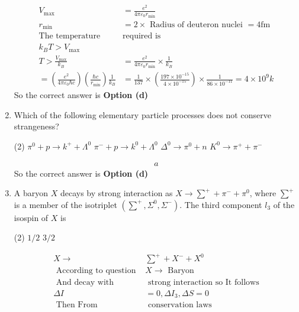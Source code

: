 \begin{enumerate}
\begin{answer}
$$\begin{aligned}
	V_{\max }&=\frac{e^2}{4 \pi \varepsilon_0 r_{\min }}\\
	r_{\min }&=2 \times\text{ Radius of deuteron nuclei }=4 \mathrm{fm}\\
	\text{The temperature }&\text{required is}\\
	k_B T>V_{\max }& \\
	T>\frac{V_{\max }}{k_B}&=\frac{e^2}{4 \pi \varepsilon_0 r_{\min }} \times \frac{1}{k_B} \\
	=\left(\frac{e^2}{4 \pi \varepsilon_0 \hbar c}\right)\left(\frac{\hbar c}{r_{\min }}\right) \frac{1}{k_B}&=\frac{1}{137} \times\left(\frac{197 \times 10^{-15}}{4 \times 10^{-15}}\right) \times \frac{1}{86 \times 10^{-11}}=4 \times 10^9 k
\end{aligned}
$$
So the correct answer is \textbf{Option (d)}
\end{answer}
	\item Which of the following elementary particle processes does not conserve strangeness?
 \begin{tasks}(2)
	\task[\textbf{a.}]$\pi^0+p \rightarrow k^{+}+\Lambda^0$
	\task[\textbf{b.}]$\pi^{-}+p \rightarrow k^0+\Lambda^0$
	\task[\textbf{c.}]$\Delta^0 \rightarrow \pi^0+n$
	\task[\textbf{d.}] $K^0 \rightarrow \pi^{+}+\pi^{-}$	
\end{tasks}
\begin{answer}
	$$
	\begin{aligned}
a
\end{aligned}
$$
So the correct answer is \textbf{Option (d)}
\end{answer}
	\item A baryon $X$ decays by strong interaction as $X \rightarrow \sum^{+}+\pi^{-}+\pi^0$, where $\sum^{+}$is a member of the isotriplet $\left(\sum^{+}, \Sigma^0, \Sigma^{-}\right)$. The third component $l_3$ of the isospin of $X$ is
 \begin{tasks}(2)
	\task[\textbf{b.}] $1 / 2$
	\task[\textbf{d.}]  $3 / 2$
\end{tasks}
\begin{answer}
	$$
	\begin{aligned}
	X \rightarrow& \sum^{+}+X^{-}+X^0\\
	\text { According to question } &X \rightarrow \text { Baryon }\\
\text { And decay with }&\text{ strong interaction so It follows}\\
\Delta I&=0, \Delta I_3, \Delta S=0\\
\text { Then From }&\text{ conservation laws}\\

\end{aligned}$$
\end{answer}
\end{enumerate}
